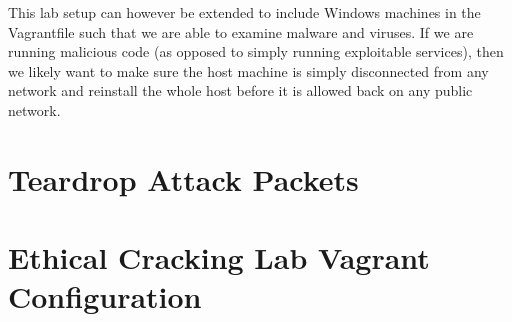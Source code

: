\documentclass{report}
\begin{document}
This lab setup can however be extended to include Windows
machines in the Vagrantfile such that we are able to examine malware and
viruses. If we are running malicious code (as opposed to simply running
exploitable services), then we likely want to make sure the host machine
is simply disconnected from any network and reinstall the whole host
before it is allowed back on any public network.

\printbibliography

\appendix

\chapter{Teardrop Attack Packets}
\label{appendix:packets}


\pagebreak


\chapter{Ethical Cracking Lab Vagrant Configuration}
\label{appendix:vagrant}


\end{document}
